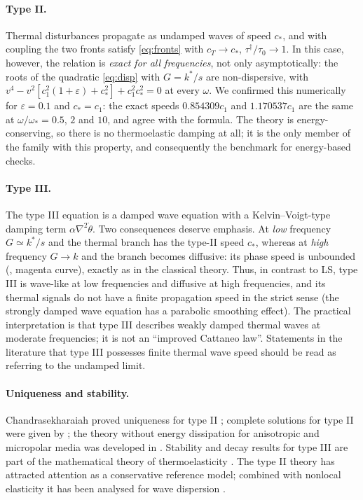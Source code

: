 \paragraph{Type II.} Thermal disturbances propagate as undamped waves of speed $c_*$, and with coupling the two fronts satisfy \eqref{eq:fronts} with $c_T\to c_*$, $\tau^\dagger/\tau_0\to1$. In this case, however, the relation is \emph{exact for all frequencies}, not only asymptotically: the roots of the quadratic \eqref{eq:disp} with $G=k^*/s$ are non-dispersive, with $v^4-v^2[c_1^2(1+\varepsilon)+c_*^2]+c_1^2c_*^2=0$ at every $\omega$. We confirmed this numerically for $\varepsilon=0.1$ and $c_*=c_1$: the exact speeds $0.854309c_1$ and $1.170537c_1$ are the same at $\omega/\omega_*=0.5$, $2$ and $10$, and agree with the formula. The theory is energy-conserving, so there is no thermoelastic damping at all; it is the only member of the family with this property, and consequently the benchmark for energy-based checks.
\paragraph{Type III.} The type III equation is a damped wave equation with a Kelvin--Voigt-type damping term $\alpha\nabla^2\dot\theta$. Two consequences deserve emphasis. At \emph{low} frequency $G\simeq k^*/s$ and the thermal branch has the type-II speed $c_*$, whereas at \emph{high} frequency $G\to k$ and the branch becomes diffusive: its phase speed is unbounded (, magenta curve), exactly as in the classical theory. Thus, in contrast to LS, type III is wave-like at low frequencies and diffusive at high frequencies, and its thermal signals do not have a finite propagation speed in the strict sense (the strongly damped wave equation has a parabolic smoothing effect). The practical interpretation is that type III describes weakly damped thermal waves at moderate frequencies; it is not an ``improved Cattaneo law''. Statements in the literature that type III possesses finite thermal wave speed should be read as referring to the undamped limit.
\paragraph{Uniqueness and stability.} Chandrasekharaiah proved uniqueness for type II \citep{Chandrasekharaiah1996}; complete solutions for type II were given by \citep{Chandrasekharaiah1997}; the theory without energy dissipation for anisotropic and micropolar media was developed in \citep{Iesan1998,Quintanilla1999,Ciarletta1999,Quintanilla2002}. Stability and decay results for type III are part of the mathematical theory of thermoelasticity \citep{Suh1998}. The type II theory has attracted attention as a conservative reference model; combined with nonlocal elasticity it has been analysed for wave dispersion \citep{Sarkar2019}.

